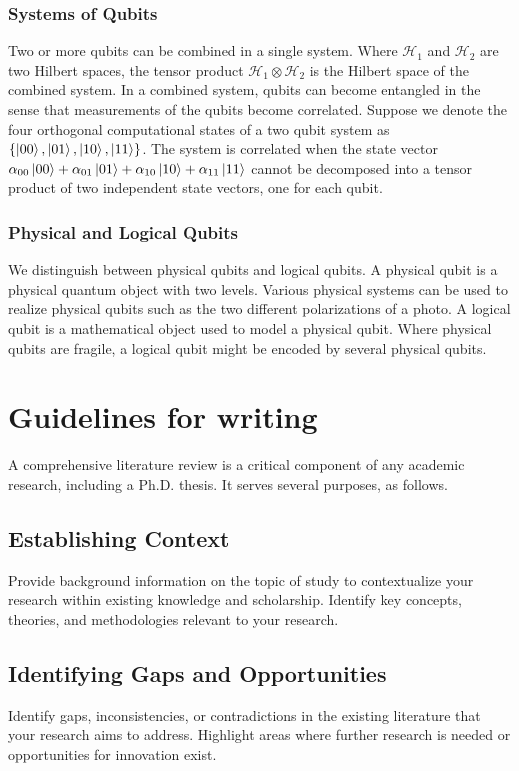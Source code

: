 \subsubsection{Systems of Qubits}
Two or more qubits can be combined in a single system.
Where $\mathcal{H}_1$ and $\mathcal{H}_2$ are two Hilbert spaces, the tensor product $\mathcal{H}_1 \otimes \mathcal{H}_2$ is the Hilbert space of the combined system.
In a combined system, qubits can become entangled in the sense that measurements of the qubits become correlated.
Suppose we denote the four orthogonal computational states of a two qubit system as $\{\ket{00}, \ket{01}, \ket{10}, \ket{11}\}$.
The system is correlated when the state vector $\alpha_{00} \ket{00} + \alpha_{01} \ket{01} + \alpha_{10} \ket{10} + \alpha_{11} \ket{11}$ cannot be decomposed into a tensor product of two independent state vectors, one for each qubit.

\subsubsection{Physical and Logical Qubits}
We distinguish between physical qubits and logical qubits.
A physical qubit is a physical quantum object with two levels.
Various physical systems can be used to realize physical qubits such as the two different polarizations of a photo.
A logical qubit is a mathematical object used to model a physical qubit.
Where physical qubits are fragile, a logical qubit might be encoded by several physical qubits.



\section{Guidelines for writing}
A comprehensive literature review is a critical component of any academic research, including a Ph.D. thesis.
It serves several purposes, as follows.

\subsection{Establishing Context}
Provide background information on the topic of study to contextualize your research within existing knowledge and scholarship.
Identify key concepts, theories, and methodologies relevant to your research.

\subsection{Identifying Gaps and Opportunities}
Identify gaps, inconsistencies, or contradictions in the existing literature that your research aims to address.
Highlight areas where further research is needed or opportunities for innovation exist.

